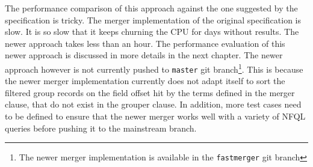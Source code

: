 The performance comparison of this approach against the one suggested by the
specification is tricky. The merger implementation of the original
specification is slow. It is so slow that it keeps churning the CPU for days
without results. The newer approach takes less than an hour. The performance
evaluation of this newer approach is discussed in more details in
 the next chapter. The
newer approach however is not currently pushed to \texttt{master} git
branch\footnote{The newer merger implementation is available in the
\texttt{fastmerger} git branch}. This is because the newer merger
implementation currently does not adapt itself to sort the filtered group
records on the field offset hit by the terms defined in the merger clause,
that do not exist in the grouper clause. In addition, more test cases need to
be defined to ensure that the newer merger works well with a variety of
\ac{NFQL} queries before pushing it to the mainstream branch.
